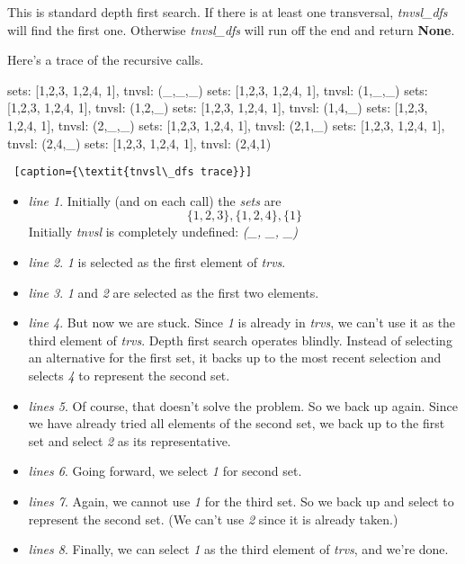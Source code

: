 This is standard depth first search. If there is at least one transversal, \textit{tnvsl\_dfs} will find the first one. Otherwise \textit{tnvsl\_dfs} will run off the end and return \textbf{None}.

Here's a trace of the recursive calls.

\midiumlv
\begin{minipage}[c]{0.45\textwidth}
\begin{python1}  
sets: [{1,2,3}, {1,2,4}, {1}], tnvsl: (_,_,_)
  sets: [{1,2,3}, {1,2,4}, {1}], tnvsl: (1,_,_)
    sets: [{1,2,3}, {1,2,4}, {1}], tnvsl: (1,2,_)
    sets: [{1,2,3}, {1,2,4}, {1}], tnvsl: (1,4,_)
  sets: [{1,2,3}, {1,2,4}, {1}], tnvsl: (2,_,_)
    sets: [{1,2,3}, {1,2,4}, {1}], tnvsl: (2,1,_)
    sets: [{1,2,3}, {1,2,4}, {1}], tnvsl: (2,4,_)
      sets: [{1,2,3}, {1,2,4}, {1}], tnvsl: (2,4,1)
\end{python1}\linv
\begin{lstlisting} [caption={\textit{tnvsl\_dfs trace}}]
\end{lstlisting}
\end{minipage}

\begin{itemize}
    \item \textit{line 1}. Initially (and on each call) the \textit{sets} are \[\{1, 2, 3\}, \{1, 2, 4\}, \{1\}\] Initially \textit{tnvsl} is completely undefined: \textit{(\_, \_, \_)}
    \item  \textit{line 2}. \textit{1} is selected as the first element of \textit{trvs}.
    \item  \textit{line 3}. \textit{1}  and \textit{2} are selected as the first two elements.
    \item \textit{line 4}. But now we are stuck. Since \textit{1} is already in \textit{trvs}, we can't use it as the third element of \textit{trvs}. Depth first search operates blindly. Instead of selecting an alternative for the first set, it backs up to the most recent selection and selects \textit{4} to represent the second set. 
    \item \textit{lines 5}. Of course, that doesn't solve the problem. So we back up again. Since we have already tried all elements of the second set, we back up to the first set and select \textit{2} as its representative. 
    \item \textit{lines 6}. Going forward, we select \textit{1} for second set.
    \item \textit{lines 7}. Again, we cannot use \textit{1} for the third set. So we back up and select  to represent the second set. (We can't use \textit{2} since it is already taken.)
    \item \textit{lines 8}. Finally, we can select \textit{1} as the third element of \textit{trvs}, and we're done.
\end{itemize}

